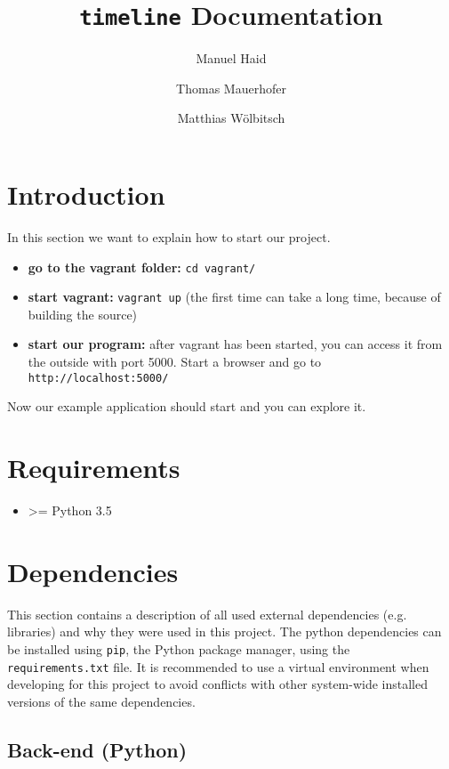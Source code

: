 \documentclass[11pt, a4paper]{article}
\author{Manuel Haid \and Thomas Mauerhofer \and Matthias Wölbitsch}
\title{\texttt{timeline} Documentation}
\begin{document}
\maketitle
\tableofcontents

\section{Introduction} \label{sec:intoduction}

In this section we want to explain how to start our project.

\begin{itemize}
\item
\textbf{go to the vagrant folder:} \texttt{cd vagrant/}
\item
\textbf{start vagrant:} \texttt{vagrant up} (the first time can take a long time, because of building the source)
\item
\textbf{start our program:} after vagrant has been started, you can access it from the outside with port 5000. 
Start a browser and go to \texttt{http://localhost:5000/}
\end{itemize}

Now our example application should start and you can explore it.

\section{Requirements} \label{sec:requirments}

\begin{itemize}
 \item \textgreater= Python 3.5
\end{itemize}
 

\section{Dependencies}\label{sec:dependencies}

This section contains a description of all used external dependencies (e.g. libraries) and why they were used in this project.
The python dependencies can be installed using \texttt{pip}, the Python package manager, using the \texttt{requirements.txt} file. 
It is recommended to use a virtual environment when developing for this project to avoid conflicts with other system-wide installed versions of the same dependencies.


\subsection{Back-end (Python)}
\end{document}
